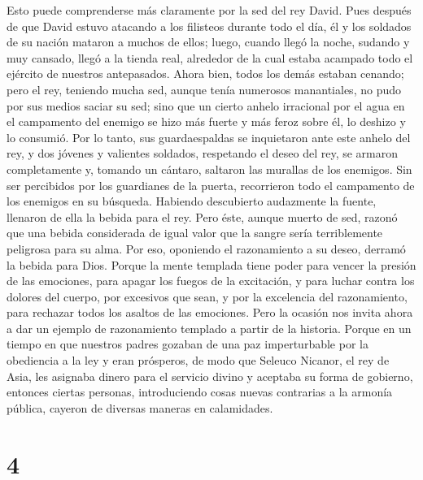  Esto puede comprenderse más claramente por la sed del rey
David.  Pues después de que David estuvo atacando a los
filisteos durante todo el día, él y los soldados de su nación mataron a
muchos de ellos;  luego, cuando llegó la noche, sudando y
muy cansado, llegó a la tienda real, alrededor de la cual estaba
acampado todo el ejército de nuestros antepasados.  Ahora
bien, todos los demás estaban cenando;  pero el rey,
teniendo mucha sed, aunque tenía numerosos manantiales, no pudo por sus
medios saciar su sed;  sino que un cierto anhelo
irracional por el agua en el campamento del enemigo se hizo más fuerte y
más feroz sobre él, lo deshizo y lo consumió.  Por lo
tanto, sus guardaespaldas se inquietaron ante este anhelo del rey, y dos
jóvenes y valientes soldados, respetando el deseo del rey, se armaron
completamente y, tomando un cántaro, saltaron las murallas de los
enemigos.  Sin ser percibidos por los guardianes de la
puerta, recorrieron todo el campamento de los enemigos en su búsqueda.
 Habiendo descubierto audazmente la fuente, llenaron de
ella la bebida para el rey.  Pero éste, aunque muerto de
sed, razonó que una bebida considerada de igual valor que la sangre
sería terriblemente peligrosa para su alma.  Por eso,
oponiendo el razonamiento a su deseo, derramó la bebida para Dios.
 Porque la mente templada tiene poder para vencer la
presión de las emociones, para apagar los fuegos de la excitación,
 y para luchar contra los dolores del cuerpo, por
excesivos que sean, y por la excelencia del razonamiento, para rechazar
todos los asaltos de las emociones.  Pero la ocasión nos
invita ahora a dar un ejemplo de razonamiento templado a partir de la
historia.  Porque en un tiempo en que nuestros padres
gozaban de una paz imperturbable por la obediencia a la ley y eran
prósperos, de modo que Seleuco Nicanor, el rey de Asia, les asignaba
dinero para el servicio divino y aceptaba su forma de gobierno,
 entonces ciertas personas, introduciendo cosas nuevas
contrarias a la armonía pública, cayeron de diversas maneras en
calamidades.

\hypertarget{section-3}{%
\section{4}\label{section-3}}

